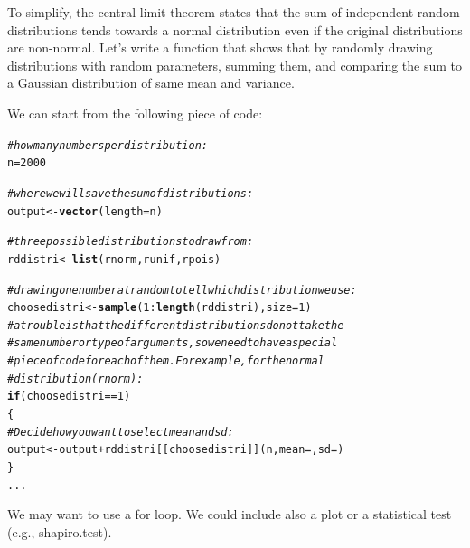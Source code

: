 \documentclass[12pt,a4paper]{scrartcl}\usepackage[]{graphicx}\usepackage[]{color}
\makeatletter
\newcommand{\hlnum}[1]{\textcolor[rgb]{0.686,0.059,0.569}{#1}}%
\newcommand{\hlcom}[1]{\textcolor[rgb]{0.678,0.584,0.686}{\textit{#1}}}%
\newcommand{\hlopt}[1]{\textcolor[rgb]{0,0,0}{#1}}%
\newcommand{\hlstd}[1]{\textcolor[rgb]{0.345,0.345,0.345}{#1}}%
\newcommand{\hlkwa}[1]{\textcolor[rgb]{0.161,0.373,0.58}{\textbf{#1}}}%
\newcommand{\hlkwb}[1]{\textcolor[rgb]{0.69,0.353,0.396}{#1}}%
\newcommand{\hlkwc}[1]{\textcolor[rgb]{0.333,0.667,0.333}{#1}}%
\newcommand{\hlkwd}[1]{\textcolor[rgb]{0.737,0.353,0.396}{\textbf{#1}}}%
\newenvironment{kframe}{%
 \def\at@end@of@kframe{}%
 \ifinner\ifhmode%
  \def\at@end@of@kframe{\end{minipage}}%
  \begin{minipage}{\columnwidth}%
 \fi\fi%
 \def\FrameCommand##1{\hskip\@totalleftmargin \hskip-\fboxsep
 \colorbox{shadecolor}{##1}\hskip-\fboxsep
     \hskip-\linewidth \hskip-\@totalleftmargin \hskip\columnwidth}%
 \MakeFramed {\advance\hsize-\width
   \@totalleftmargin\z@ \linewidth\hsize
   \@setminipage}}%
 {\par\unskip\endMakeFramed%
 \at@end@of@kframe}
\newenvironment{knitrout}{}{} %
\makeatother
\begin{document}
\clearpage

\begin{Exercise}[difficulty=2, title={Recover the central-limit theorem}]
To simplify, the central-limit theorem states that the sum of independent random distributions tends towards a normal distribution even if the original distributions are non-normal.
Let's write a function that shows that by randomly drawing distributions with random parameters, summing them, and comparing the sum to a Gaussian distribution of same mean and variance.

We can start from the following piece of code:
\begin{knitrout}
\color{fgcolor}\begin{kframe}
\begin{alltt}
\hlcom{#how many numbers per distribution:}
\hlstd{n}\hlkwb{=}\hlnum{2000}

\hlcom{# where we will save the sum of distributions:}
\hlstd{output} \hlkwb{<-} \hlkwd{vector}\hlstd{(}\hlkwc{length} \hlstd{= n)}

\hlcom{# three possible distributions to draw from:}
\hlstd{rddistri} \hlkwb{<-} \hlkwd{list}\hlstd{(rnorm,runif,rpois)}

\hlcom{# drawing one number at random to tell which distribution we use:}
\hlstd{choosedistri} \hlkwb{<-} \hlkwd{sample}\hlstd{(}\hlnum{1}\hlopt{:}\hlkwd{length}\hlstd{(rddistri),} \hlkwc{size} \hlstd{=} \hlnum{1}\hlstd{)}
\hlcom{# a trouble is that the different distributions do not take the }
\hlcom{#same number or type of arguments, so we need to have a special}
\hlcom{#piece of code for each of them. For example, for the normal}
\hlcom{#distribution (rnorm):}
\hlkwa{if}\hlstd{(choosedistri}\hlopt{==}\hlnum{1}\hlstd{)}
\hlstd{\{}
    \hlcom{# Decide how you want to select mean and sd:}
     \hlstd{output} \hlkwb{<-} \hlstd{output} \hlopt{+} \hlstd{rddistri[[choosedistri]](n,} \hlkwc{mean}\hlstd{=,} \hlkwc{sd}\hlstd{=)}
\hlstd{\}}
\hlstd{...}
\end{alltt}
\end{kframe}
\end{knitrout}

We may want to use a for loop. We could include also a plot or a statistical test (e.g., shapiro.test).
\end{Exercise}
\end{document}
